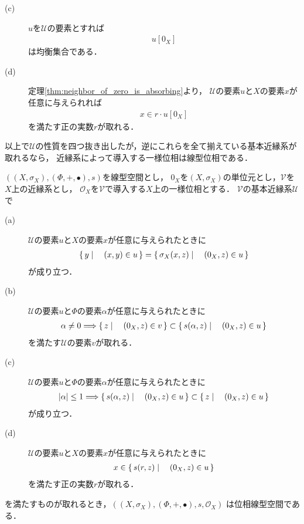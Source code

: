 \begin{description}
		\item[(c)] $u$を$\mathscr{U}$の要素とすれば
			\begin{align}
				u[0_X]
			\end{align}
			は均衡集合である．
			
		\item[(d)] 定理\ref{thm:neighbor_of_zero_is_absorbing}より，
			$\mathscr{U}$の要素$u$と$X$の要素$x$が任意に与えられれば
			\begin{align}
				x \in r \cdot u[0_X]
			\end{align}
			を満たす正の実数$r$が取れる．
	\end{description}
	
	以上で$\mathscr{U}$の性質を四つ抜き出したが，逆にこれらを全て揃えている基本近縁系が取れるなら，
	近縁系によって導入する一様位相は線型位相である．
	
	\begin{screen}
		\begin{thm}[線型位相を導入する近縁系]
		\label{thm:entourages_introducing_vector_topology}
			$\left(\left(X,\sigma_X\right),(\Phi,+,\bullet),s\right)$を線型空間とし，
			$0_X$を$\left(X,\sigma_X\right)$の単位元とし，$\mathscr{V}$を$X$上の近縁系とし，
			$\mathscr{O}_X$を$\mathscr{V}$で導入する$X$上の一様位相とする．
			$\mathscr{V}$の基本近縁系$\mathscr{U}$で
			\begin{description}
				\item[(a)] $\mathscr{U}$の要素$u$と$X$の要素$x$が任意に与えられたときに
					\begin{align}
						\left\{\, y \mid \quad (x,y) \in u\, \right\} = \left\{\, \sigma_X(x,z) \mid \quad (0_X,z) \in u\, \right\}
					\end{align}
					が成り立つ．
						
				\item[(b)] $\mathscr{U}$の要素$u$と$\Phi$の要素$\alpha$が任意に与えられたときに
					\begin{align}
						\alpha \neq 0 \Longrightarrow \left\{\, z \mid \quad (0_X,z) \in v\, \right\} \subset \left\{\, s(\alpha,z) \mid \quad (0_X,z) \in u\, \right\}
					\end{align}
					を満たす$\mathscr{U}$の要素$v$が取れる．
					
				\item[(c)] $\mathscr{U}$の要素$u$と$\Phi$の要素$\alpha$が任意に与えられたときに
					\begin{align}
						|\alpha| \leq 1 \Longrightarrow \left\{\, s(\alpha,z) \mid \quad (0_X,z) \in u\, \right\} \subset \left\{\, z \mid \quad (0_X,z) \in u\, \right\}
					\end{align}
					が成り立つ．
					
				\item[(d)] $\mathscr{U}$の要素$u$と$X$の要素$x$が任意に与えられたときに
					\begin{align}
						x \in \left\{\, s(r,z) \mid \quad (0_X,z) \in u\, \right\}
					\end{align}
					を満たす正の実数$r$が取れる．
			\end{description}
			を満たすものが取れるとき，$\left(\left(X,\sigma_X\right),(\Phi,+,\bullet),s,\mathscr{O}_X\right)$
			は位相線型空間である．
		\end{thm}
	\end{screen}
	
